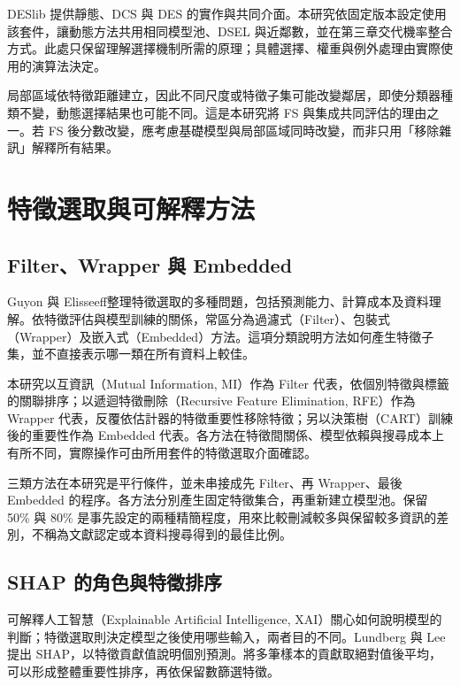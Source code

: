 DESlib 提供靜態、DCS 與 DES 的實作與共同介面\autocite{cruz2020deslib}。本研究依固定版本設定使用該套件，讓動態方法共用相同模型池、DSEL 與近鄰數，並在第三章交代機率整合方式。此處只保留理解選擇機制所需的原理；具體選擇、權重與例外處理由實際使用的演算法決定。

局部區域依特徵距離建立，因此不同尺度或特徵子集可能改變鄰居，即使分類器種類不變，動態選擇結果也可能不同。這是本研究將 FS 與集成共同評估的理由之一。若 FS 後分數改變，應考慮基礎模型與局部區域同時改變，而非只用「移除雜訊」解釋所有結果。

\section{特徵選取與可解釋方法}

\subsection{Filter、Wrapper 與 Embedded}

Guyon 與 Elisseeff\autocite{guyon2003selection}整理特徵選取的多種問題，包括預測能力、計算成本及資料理解。依特徵評估與模型訓練的關係，常區分為過濾式（Filter）、包裝式（Wrapper）及嵌入式（Embedded）方法。這項分類說明方法如何產生特徵子集，並不直接表示哪一類在所有資料上較佳。

本研究以互資訊（Mutual Information, MI）作為 Filter 代表，依個別特徵與標籤的關聯排序；以遞迴特徵刪除（Recursive Feature Elimination, RFE）作為 Wrapper 代表，反覆依估計器的特徵重要性移除特徵；另以決策樹（CART）訓練後的重要性作為 Embedded 代表。各方法在特徵間關係、模型依賴與搜尋成本上有所不同，實際操作可由所用套件的特徵選取介面確認\autocite{sklearn-fs-docs}。

三類方法在本研究是平行條件，並未串接成先 Filter、再 Wrapper、最後 Embedded 的程序。各方法分別產生固定特徵集合，再重新建立模型池。保留 50\% 與 80\% 是事先設定的兩種精簡程度，用來比較刪減較多與保留較多資訊的差別，不稱為文獻認定或本資料搜尋得到的最佳比例。

\subsection{SHAP 的角色與特徵排序}

可解釋人工智慧（Explainable Artificial Intelligence, XAI）關心如何說明模型的判斷；特徵選取則決定模型之後使用哪些輸入，兩者目的不同。Lundberg 與 Lee\autocite{lundberg2017shap}提出 SHAP，以特徵貢獻值說明個別預測。將多筆樣本的貢獻取絕對值後平均，可以形成整體重要性排序，再依保留數篩選特徵。


